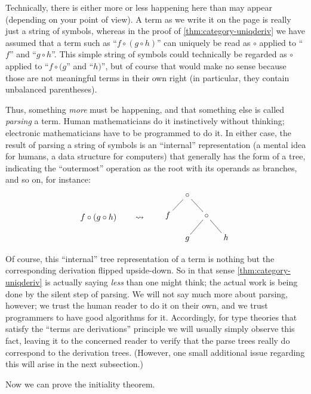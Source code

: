 \documentclass{book}
\begin{document}
\begin{rmk}
  Technically, there is either more or less happening here than may appear (depending on your point of view).
  A term as we write it on the page is really just a string of symbols, whereas in the proof of \cref{thm:category-uniqderiv} we have assumed that a term such as ``$f\circ (g\circ h)$'' can uniquely be read as $\circ$ applied to ``$f$'' and ``$g\circ h$''.
  This simple string of symbols could technically be regarded as $\circ$ applied to ``$f\circ (g$'' and ``$h)$'', but of course that would make no sense because those are not meaningful terms in their own right (in particular, they contain unbalanced parentheses).

  Thus, something \emph{more} must be happening, and that something else is called \emph{parsing} a term.
  Human mathematicians do it instinctively without thinking; electronic mathematicians have to be programmed to do it.
  In either case, the result of parsing a string of symbols is an ``internal'' representation (a mental idea for humans, a data structure for computers) that generally has the form of a tree, indicating the ``outermost'' operation as the root with its operands as branches, and so on, for instance:
  \[ f\circ (g\circ h) \qquad\leadsto\qquad \vcenter{\xymatrix@-1pc{ & \circ \ar@{-}[dl] \ar@{-}[dr]\\
      f && \circ \ar@{-}[dl]\ar@{-}[dr]\\
      & g && h }} \]

  Of course, this ``internal'' tree representation of a term is nothing but the corresponding derivation flipped upside-down.
  So in that sense \cref{thm:category-uniqderiv} is actually saying \emph{less} than one might think; the actual work is being done by the silent step of parsing.
  We will not say much more about parsing, however; we trust the human reader to do it on their own, and we trust programmers to have good algorithms for it.
  Accordingly, for type theories that satisfy the ``terms are derivations'' principle we will usually simply observe this fact, leaving it to the concerned reader to verify that the parse trees really do correspond to the derivation trees.
  (However, one small additional issue regarding this will arise in the next subsection.)
\end{rmk}

Now we can prove the initiality theorem.
\end{document}
